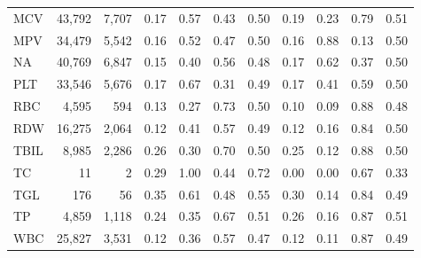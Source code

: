 \begin{table}[ht]
\begin{tabular}{lrrrrrrrrrr}
MCV & 43,792 & 7,707 & 0.17 & 0.57 & 0.43 & 0.50 & 0.19 & 0.23 & 0.79 & 0.51 \\
MPV & 34,479 & 5,542 & 0.16 & 0.52 & 0.47 & 0.50 & 0.16 & 0.88 & 0.13 & 0.50 \\
NA & 40,769 & 6,847 & 0.15 & 0.40 & 0.56 & 0.48 & 0.17 & 0.62 & 0.37 & 0.50 \\
PLT & 33,546 & 5,676 & 0.17 & 0.67 & 0.31 & 0.49 & 0.17 & 0.41 & 0.59 & 0.50 \\
RBC & 4,595 & 594 & 0.13 & 0.27 & 0.73 & 0.50 & 0.10 & 0.09 & 0.88 & 0.48 \\
RDW & 16,275 & 2,064 & 0.12 & 0.41 & 0.57 & 0.49 & 0.12 & 0.16 & 0.84 & 0.50 \\
TBIL & 8,985 & 2,286 & 0.26 & 0.30 & 0.70 & 0.50 & 0.25 & 0.12 & 0.88 & 0.50 \\
TC & 11 & 2 & 0.29 & 1.00 & 0.44 & 0.72 & 0.00 & 0.00 & 0.67 & 0.33 \\
TGL & 176 & 56 & 0.35 & 0.61 & 0.48 & 0.55 & 0.30 & 0.14 & 0.84 & 0.49 \\
TP & 4,859 & 1,118 & 0.24 & 0.35 & 0.67 & 0.51 & 0.26 & 0.16 & 0.87 & 0.51 \\
WBC & 25,827 & 3,531 & 0.12 & 0.36 & 0.57 & 0.47 & 0.12 & 0.11 & 0.87 & 0.49 \\
\bottomrule
\end{tabular}
\label{tab:eicu_eval_sepsis}
\end{table}